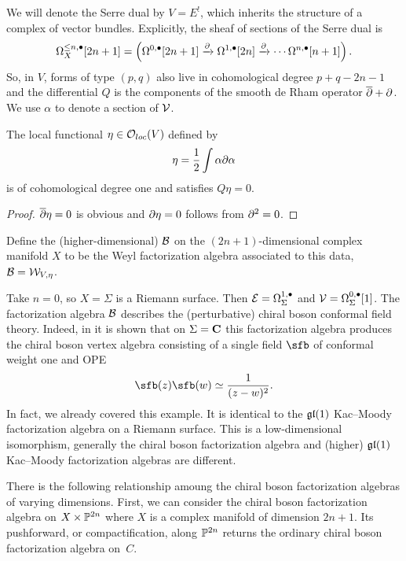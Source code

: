 \documentclass[11pt]{amsart}
\begin{document}
We will denote the Serre dual by $V = E^!$, which inherits the structure of a complex of vector bundles.
Explicitly, the sheaf of sections of the Serre dual is
\begin{equation}\label{eqn:bosonV}
  \Omega^{\leq n, \bullet}_X [2n+1] = \left(\Omega^{0,\bullet} [2n+1] \xrightarrow{\partial} \Omega^{1,\bullet}[2n] \xrightarrow{\partial} \cdots \Omega^{n,\bullet} [n+1]\right) .
\end{equation}
So, in $V$, forms of type $(p,q)$ also live in cohomological degree $p+q-2n-1$ and the differential $Q$ is the components of the smooth de Rham operator $\overline{\partial} + \partial$.
We use $\alpha$ to denote a section of $\mathcal V$.

\begin{lem}
The local functional $\eta \in {\mathcal O}_{loc}(V)$ defined by
\begin{equation}\label{eqn:bosoneta}
\eta = \frac12 \int \alpha \partial \alpha 
\end{equation}
is of cohomological degree one and satisfies $Q \eta = 0$.
\end{lem}
\begin{proof}
$\overline{\partial} \eta = 0$ is obvious and $\partial \eta = 0$ follows from $\partial^2 = 0$.
\end{proof}

Define the (higher-dimensional)  $\mathcal B$ on the $(2n+1)$-dimensional complex manifold $X$ to be the Weyl factorization algebra associated to this data, $\mathcal B = \mathcal W_{V,\eta}$.

Take $n=0$, so $X=\Sigma$ is a Riemann surface.
Then $\mathcal E = \Omega^{1,\bullet}_\Sigma$ and $\mathcal V = \Omega^{0,\bullet}_\Sigma [1]$.
The factorization algebra $\mathcal B$ describes the (perturbative) chiral boson conformal field theory.
Indeed, in \cite[??]{CG1} it is shown that on $\Sigma = \mathbf{C}$ this factorization algebra produces the chiral boson vertex algebra consisting of a single field $\sfb$ of conformal weight one and OPE
\begin{equation}
\sfb(z) \sfb(w) \simeq \frac{1}{(z-w)^2} .
\end{equation}
In fact, we already covered this example.
It is identical to the $\mathfrak{gl}(1)$ Kac--Moody factorization algebra on a Riemann surface.
This is a low-dimensional isomorphism, generally the chiral boson factorization algebra and (higher) $\mathfrak{gl}(1)$
Kac--Moody factorization algebras are different.

There is the following relationship amoung the chiral boson factorization algebras of varying dimensions.
First, we can consider the chiral boson factorization algebra on $X \times \mathbb P^{2n}$ where $X$ is a complex manifold of dimension $2n+1$.
Its pushforward, or compactification, along $\mathbb P^{2n}$ returns the ordinary chiral boson factorization algebra on~$C$.
\end{document}
